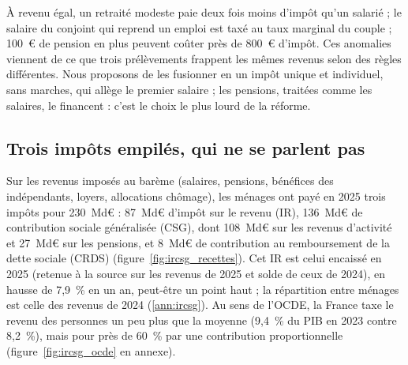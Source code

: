 
À revenu égal, un retraité modeste paie deux fois moins d'impôt qu'un salarié ; le salaire du conjoint qui reprend un
emploi est taxé au taux marginal du couple ; 100~€ de pension en plus peuvent coûter près de 800~€ d'impôt. Ces
anomalies viennent de ce que trois prélèvements frappent les mêmes revenus selon des règles différentes. Nous proposons
de les fusionner en un impôt unique et individuel, sans marches, qui allège le premier salaire ; les pensions, traitées
comme les salaires, le financent : c'est le choix le plus lourd de la réforme.

\subsection{Trois impôts empilés, qui ne se parlent pas}

Sur les revenus imposés au barème (salaires, pensions, bénéfices des indépendants, loyers, allocations chômage), les
ménages ont payé en 2025 trois impôts pour 230~Md€ : 87~Md€ d'impôt sur le revenu (IR), 136~Md€ de contribution sociale
généralisée (CSG), dont 108~Md€ sur les revenus d'activité et 27~Md€ sur les pensions, et 8~Md€ de contribution au
remboursement de la dette sociale (CRDS) (figure~\ref{fig:ircsg_recettes}). Cet IR est celui encaissé en 2025 (retenue à
la source sur les revenus de 2025 et solde de ceux de 2024), en hausse de 7,9~\% en un an, peut-être un point haut ; la
répartition entre ménages est celle des revenus de 2024 (\ref{ann:ircsg}). Au sens de l'OCDE, la France taxe le revenu
des personnes un peu plus que la moyenne (9,4~\% du PIB en 2023 contre 8,2~\%), mais pour près de 60~\% par une
contribution proportionnelle (figure~\ref{fig:ircsg_ocde} en annexe).


